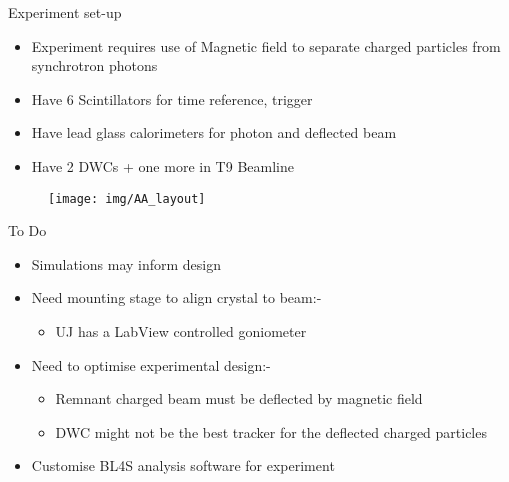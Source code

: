 \documentclass{beamer}
\begin{document}
\begin{frame}{Experiment set-up}
\begin{itemize}
\item Experiment requires use of Magnetic field to separate charged particles from synchrotron photons

\item Have 6 Scintillators for time reference, trigger

\item Have lead glass calorimeters for photon and deflected beam

\item Have 2 DWCs + one more in T9 Beamline
\end{itemize}
\begin{figure}
  \centering
    \texttt{[image: img/AA\_layout]}
\end{figure}
\end{frame}

\begin{frame}{To Do}
\begin{itemize}
\item Simulations may inform design
\item Need mounting stage to align crystal to beam:-
\begin{itemize}\item UJ has a LabView controlled goniometer \end{itemize}
\item Need to optimise experimental design:-
\begin{itemize}\item Remnant charged beam must be deflected by magnetic field
\item DWC might not be the best tracker for the deflected charged particles\end{itemize}
\item Customise BL4S analysis software for experiment
\end{itemize}
\end{frame}
\end{document}
